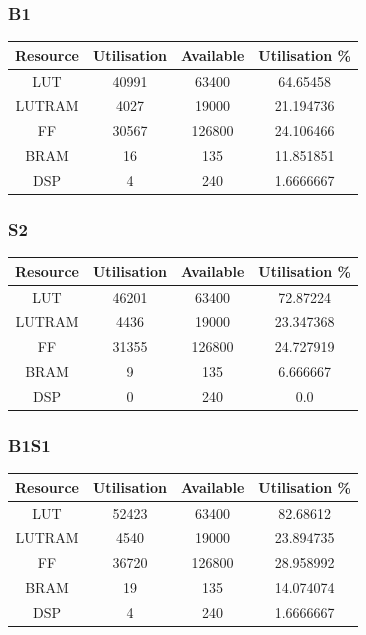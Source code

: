 \subsubsection{B1}
\begin{center}
\begin{tabular}{c c c c}
    Resource & Utilisation & Available & Utilisation \% \\
    \hline
    LUT	& 40991 & 63400 & 64.65458 \\
    \hline
    LUTRAM & 4027 & 19000 & 21.194736 \\
    \hline
    FF & 30567 & 126800 & 24.106466 \\
    \hline
    BRAM & 16 & 135 & 11.851851 \\
    \hline
    DSP & 4 & 240 & 1.6666667 \\
    \hline
\end{tabular}
\end{center}

\subsubsection{S2}
\begin{center}
\begin{tabular}{c c c c}
    Resource & Utilisation & Available & Utilisation \% \\
    \hline
    LUT	& 46201	& 63400	& 72.87224 \\
    \hline
    LUTRAM	& 4436 & 19000	& 23.347368 \\
    \hline
    FF & 31355 & 126800 & 24.727919 \\
    \hline
    BRAM & 9 & 135 & 6.666667 \\
    \hline
    DSP & 0 & 240 & 0.0 \\
    \hline
\end{tabular}
\end{center}

\subsubsection{B1S1}
\begin{center}
\begin{tabular}{c c c c}
    Resource & Utilisation & Available & Utilisation \% \\
    \hline
    LUT & 52423 & 63400 & 82.68612 \\
    \hline
    LUTRAM & 4540 & 19000 & 23.894735 \\
    \hline
    FF & 36720 & 126800 & 28.958992 \\
    \hline
    BRAM & 19 & 135 & 14.074074 \\
    \hline
    DSP & 4 & 240 & 1.6666667 \\
    \hline
\end{tabular}
\end{center}

